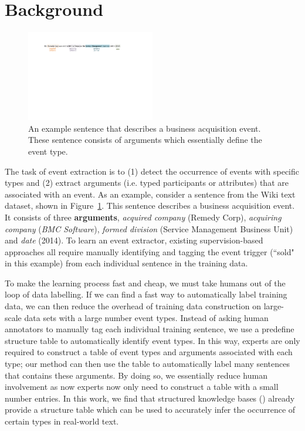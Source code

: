\section{Background}
\begin{figure}
  \centering
  \includegraphics[width=0.5\textwidth]{figs/example.pdf}
  \caption{An example sentence that describes a business acquisition event. These sentence consists of arguments which essentially define
  the event type.}
  \label{fig:example}
\end{figure}


The task of event extraction is to (1) detect the occurrence of events with specific types and (2) extract arguments (i.e. typed
participants or attributes) that are associated with an event. As an example, consider a sentence from the Wiki text dataset, shown in
Figure~\ref{fig:example}. This sentence describes a business acquisition event. It consists of three \textbf{arguments}, \emph{acquired
company} (Remedy Corp), \emph{acquiring company} (\emph{BMC Software}), \emph{formed division} (Service Management Business Unit) and
\emph{date} (2014). To learn an event extractor, existing supervision-based approaches all require manually identifying and tagging the
event trigger (``sold" in this example) from each individual sentence in the training data.


To make the learning process fast and cheap, we must take humans out of the loop of data labelling. If we can find a fast way to
automatically label training data, we can then reduce the overhead of training data construction on large-scale data sets with a large
number event types. Instead of asking human annotators to manually tag each individual training sentence, we use a predefine structure
table to automatically identify event types. In this way, experts are only required to construct a table of event types and arguments
associated with each type; our method can then use the table to automatically label many sentences that contains these arguments. By doing
so, we essentially reduce human involvement as now experts now only need to construct a table with a small number entries.   In this work, we find that structured  knowledge bases (\KB) already provide a structure table which
can be used to accurately infer the occurrence of certain types in real-world text.



